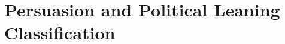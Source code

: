 


\section{\statusgreen Persuasion and Political Leaning Classification}
\label{sec:ps_prop_and_leaning}

